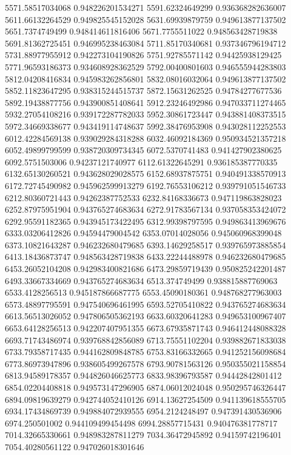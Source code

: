 {5571.58517034068 0.948226201534271
5591.62324649299 0.936368282636007
5611.66132264529 0.949825545152028
5631.69939879759 0.949613877137502
5651.7374749499 0.948414611816406
5671.7755511022 0.948563428719838
5691.81362725451 0.946995238463084
5711.85170340681 0.937346796194712
5731.88977955912 0.942273104190826
5751.92785571142 0.94425938129425
5771.96593186373 0.934608928362529
5792.00400801603 0.946555944283803
5812.04208416834 0.945983262856801
5832.08016032064 0.949613877137502
5852.11823647295 0.938315244515737
5872.15631262525 0.94784277677536
5892.19438877756 0.943900851408641
5912.23246492986 0.947033711274465
5932.27054108216 0.939172287782033
5952.30861723447 0.943881408373515
5972.34669338677 0.943419114748637
5992.38476953908 0.943028112252553
6012.42284569138 0.939029284318288
6032.46092184369 0.950934521357218
6052.49899799599 0.938720309734345
6072.5370741483 0.941427902380625
6092.5751503006 0.94237121740977
6112.61322645291 0.936185387770335
6132.65130260521 0.943628029028575
6152.68937875751 0.940491338570913
6172.72745490982 0.945962599913279
6192.76553106212 0.939791051546733
6212.80360721443 0.94262387752533
6232.84168336673 0.947119863828023
6252.87975951904 0.943765274683634
6272.91783567134 0.937058353424072
6292.95591182365 0.943945173422495
6312.99398797595 0.949863413969676
6333.03206412826 0.94594479004542
6353.07014028056 0.945060968399048
6373.10821643287 0.946232680479685
6393.14629258517 0.939765973885854
6413.18436873747 0.948563428719838
6433.22244488978 0.946232680479685
6453.26052104208 0.942983400821686
6473.29859719439 0.950825242201487
6493.33667334669 0.943765274683634
6513.374749499 0.938815887769063
6533.4128256513 0.945187866687775
6553.45090180361 0.948768277963003
6573.48897795591 0.947540696461995
6593.52705410822 0.943765274683634
6613.56513026052 0.947806505362193
6633.60320641283 0.949653100967407
6653.64128256513 0.942207407951355
6673.67935871743 0.946412448088328
6693.71743486974 0.939768842856089
6713.75551102204 0.939882671833038
6733.79358717435 0.944162809848785
6753.83166332665 0.941252156098684
6773.86973947896 0.938605499267578
6793.90781563126 0.950355021158854
6813.94589178357 0.944826046625773
6833.98396793587 0.94442842801412
6854.02204408818 0.949573147296905
6874.06012024048 0.950295746326447
6894.09819639279 0.942744052410126
6914.13627254509 0.941139618555705
6934.17434869739 0.949884072939555
6954.2124248497 0.947391430536906
6974.250501002 0.944109499454498
6994.28857715431 0.940476381778717
7014.32665330661 0.948983287811279
7034.36472945892 0.94159742196401
7054.40280561122 0.947026018301646
}
